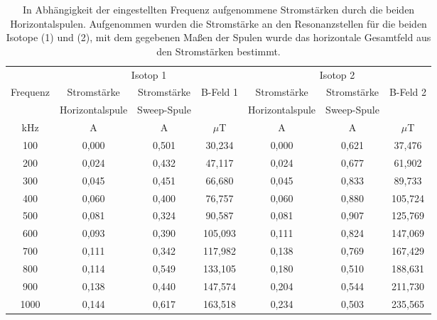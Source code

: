 \begin{table}
  \centering
  \caption{In Abhängigkeit der eingestellten Frequenz aufgenommene Stromstärken durch die beiden Horizontalspulen. Aufgenommen wurden die Stromstärke an den Resonanzstellen für die beiden Isotope (1) und (2), mit dem gegebenen Maßen der Spulen wurde das horizontale Gesamtfeld aus den Stromstärken bestimmt.}
  \label{tab:Tab1}
    \begin{tabular}{c c c c c c c}
      \toprule
       &    \multicolumn{3}{c}{Isotop 1} & \multicolumn{3}{c}{Isotop 2}\\
      Frequenz  & Stromstärke & Stromstärke & B-Feld 1 & Stromstärke & Stromstärke &  B-Feld 2\\
        & Horizontalspule & Sweep-Spule & & Horizontalspule & Sweep-Spule&\\
      kHz & A& A& $\mu$T & A& A& $\mu$T\\
      \midrule
      \midrule
      100     & 0,000  &  0,501 &  30,234  &  0,000 &  0,621 &  37,476 \\
      200     & 0,024  &  0,432 &  47,117  &  0,024 &  0,677 &  61,902 \\
      300     & 0,045  &  0,451 &  66,680  &  0,045 &  0,833 &  89,733 \\
      400     & 0,060  &  0,400 &  76,757  &  0,060 &  0,880 & 105,724 \\
      500     & 0,081  &  0,324 &  90,587  &  0,081 &  0,907 & 125,769 \\
      600     & 0,093  &  0,390 & 105,093  &  0,111 &  0,824 & 147,069 \\
      700     & 0,111  &  0,342 & 117,982  &  0,138 &  0,769 & 167,429 \\
      800     & 0,114  &  0,549 & 133,105  &  0,180 &  0,510 & 188,631 \\
      900     & 0,138  &  0,440 & 147,574  &  0,204 &  0,544 & 211,730 \\
      1000    & 0,144  &  0,617 & 163,518  &  0,234 &  0,503 & 235,565 \\
      \bottomrule
    \end{tabular}
\end{table}
